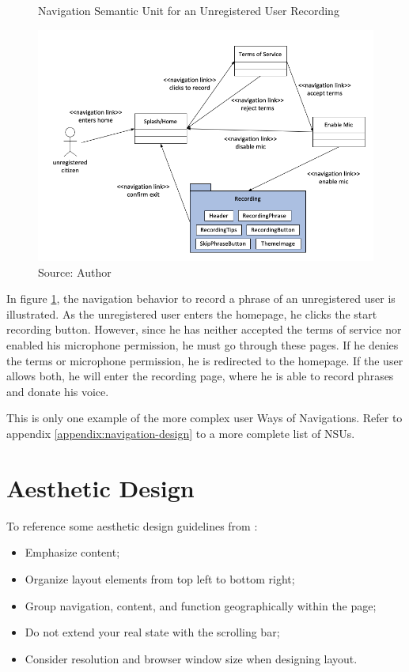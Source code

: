 \begin{figure}[h]
    \centering
    \caption{Navigation Semantic Unit for an Unregistered User Recording}
    \label{fig:app-nsu-example}
    \includegraphics[width=\linewidth]{images/sw-req-spec/nsu-unregistered.png}
    \caption*{Source: Author}
\end{figure}

In figure \ref{fig:app-nsu-example}, the navigation behavior to record a phrase of an unregistered user is illustrated. As the unregistered user enters the homepage, he clicks the start recording button. However, since he has neither accepted the terms of service nor enabled his microphone permission, he must go through these pages. If he denies the terms or microphone permission, he is redirected to the homepage. If the user allows both, he will enter the recording page, where he is able to record phrases and donate his voice.

This is only one example of the more complex user Ways of Navigations. Refer to appendix \ref{appendix:navigation-design} to a more complete list of NSUs.

\section{Aesthetic Design}
\label{sec:aesthetic-design}

To reference some aesthetic design guidelines from \cite{pressman2014software}:

\begin{itemize}
    \item Emphasize content;
    \item Organize layout elements from top left to bottom right;
    \item Group navigation, content, and function geographically within the page;
    \item Do not extend your real state with the scrolling bar;
    \item Consider resolution and browser window size when designing layout.
\end{itemize}

